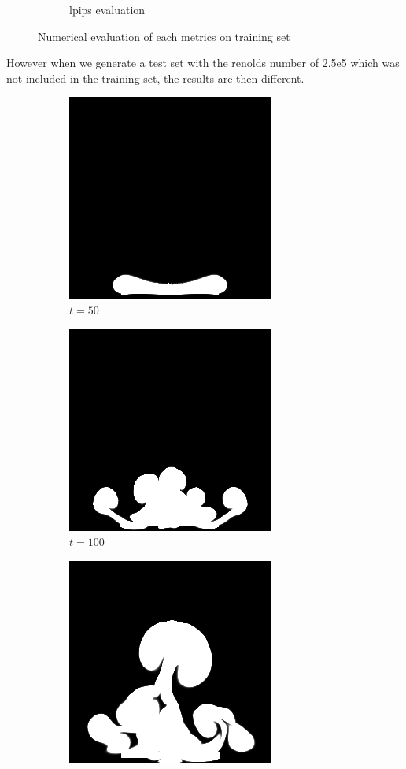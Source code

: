 \documentclass[a4paper,12pt,twoside]{report}
\begin{document}
\begin{figure}
\begin{subfigure}{0.49\textwidth}
  \caption{lpips evaluation}
\end{subfigure}
\caption{Numerical evaluation of each metrics on training set}
\end{figure}


However when we generate a test set with the renolds number of 2.5e5 which was not included in the training set, the results are then different.
\begin{figure}
\centering
\begin{subfigure}{0.18\textwidth}
  \centering
  \includegraphics[scale=0.28]{buoyancy_test/dens_000050_ref.png}
  \caption{$t=50$}
\end{subfigure}
\begin{subfigure}{0.18\textwidth}
  \centering
  \includegraphics[scale=0.28]{buoyancy_test/dens_000100_ref.png}
  \caption{$t=100$}
\end{subfigure}
\begin{subfigure}{0.18\textwidth}
  \centering
  \includegraphics[scale=0.28]{buoyancy_test/dens_000150_ref.png}

\end{subfigure}
\end{figure}
\end{document}
